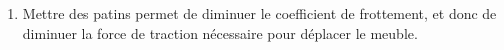\documentclass[a4paper, 12pt, final, garamond]{book}
\begin{document}
\begin{enumerate}
\begin{enumerate}[leftmargin=20pt]
\begin{itemize}[label=$\diamond$, leftmargin=10pt]
\begin{gather*}
\begin{array}{rcl}
                                    f & = & \num{0.25}
                                \end{array}
                            \right.\\
                            \AN
                            \boxed{F = \SI{250}{N}}
                            \Lra
                            \boxed{\frac{F}{g} = \SI{25}{kg}}
                        \end{gather*}
                \end{itemize}
                Ainsi, il suffit de fournir une force égale à un quart du poids.
            \item Mettre des patins permet de diminuer le coefficient de
                frottement, et donc de diminuer la force de traction nécessaire
                pour déplacer le meuble.
        \end{enumerate}
\end{enumerate}
\end{document}
